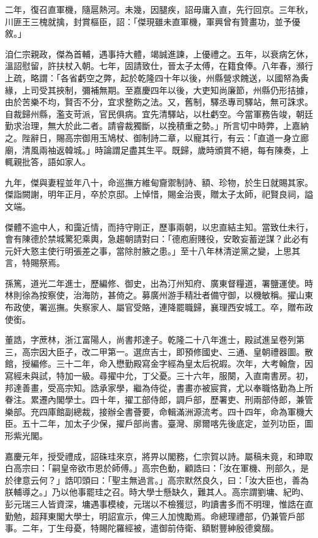 \begin{pinyinscope}
二年，復召直軍機，隨扈熱河。未幾，因腿疾，詔毋庸入直，先行回京。三年秋，川匪王三槐就擒，封賞樞臣，詔：「傑現雖未直軍機，軍興曾有贊畫功，並予優敘。」

洎仁宗親政，傑為首輔，遇事持大體，竭誠進諫，上優禮之。五年，以衰病乞休，溫詔慰留，許扶杖入朝。七年，固請致仕，晉太子太傅，在籍食俸。八年春，瀕行上疏，略謂：「各省虧空之弊，起於乾隆四十年以後，州縣營求餽送，以國帑為夤緣，上司受其挾制，彌補無期。至嘉慶四年以後，大吏知尚廉節，州縣仍形拮據，由於苦樂不均，賢否不分，宜求整飭之法。又，舊制，驛丞專司驛站，無可誅求。自裁歸州縣，濫支苛派，官民俱病。宜先清驛站，以杜虧空。今當軍務告竣，朝廷勤求治理，無大於此二者。請睿裁獨斷，以挽積重之勢。」所言切中時弊，上嘉納之。陛辭日，賜高宗御用玉鳩杖、御制詩二章，以寵其行，有云：「直道一身立廊廟，清風兩袖返韓城。」時論謂足盡其生平。既歸，歲時頒賞不絕，每有陳奏，上輒親批答，語如家人。

九年，傑與妻程並年八十，命巡撫方維甸齎禦制詩、額、珍物，於生日就賜其家。傑詣闕謝，明年正月，卒於京邸。上悼惜，賜金治喪，贈太子太師，祀賢良祠，謚文端。

傑體不逾中人，和靄近情，而持守剛正，歷事兩朝，以忠直結主知。當致仕未行，會有陳德於禁城驚犯乘輿，急趨朝請對曰：「德庖廚賤役，安敢妄蓄逆謀？此必有元奸大憝主使行明張差之事，當除肘腋之患。」至十八年林清逆黨之變，上思其言，特賜祭焉。

孫篤，道光二年進士，歷編修、御史，出為汀州知府、廣東督糧道，署鹽運使。時林則徐為按察使，治海防，甚倚之。募廣州游手精壯者備守御，以機敏稱。擢山東布政使，署巡撫。失察家人、屬官受賂，連降罷職歸，襄理西安城工。卒，贈布政使銜。

董誥，字蔗林，浙江富陽人，尚書邦達子。乾隆二十八年進士，殿試進呈卷列第三，高宗因大臣子，改二甲第一。選庶吉士，即預修國史、三通、皇朝禮器圖。散館，授編修。三十二年，命入懋勤殿寫金字經為皇太后祝嘏。次年，大考翰詹，因寫經未與試，特加一級。尋擢中允，丁父憂。三十六年，服闋，入直南書房。初，邦達善畫，受高宗知。誥承家學，繼為侍從，書畫亦被宸賞，尤以奉職恪勤為上所眷注。累遷內閣學士。四十年，擢工部侍郎，調戶部，歷署吏、刑兩部侍郎，兼管樂部。充四庫館副總裁，接辦全書薈要，命輯滿洲源流考。四十四年，命為軍機大臣。五十二年，加太子少保，擢戶部尚書。臺灣、廓爾喀先後底定，並列功臣，圖形紫光閣。

嘉慶元年，授受禮成，詔硃珪來京，將畀以閣務，仁宗賀以詩。屬稿未竟，和珅取白高宗曰：「嗣皇帝欲市恩於師傅。」高宗色動，顧誥曰：「汝在軍機、刑部久，是於律意云何？」誥叩頭曰：「聖主無過言。」高宗默然良久，曰：「汝大臣也，善為朕輔導之。」乃以他事罷珪之召。時大學士懸缺久，難其人。高宗謂劉墉、紀昀、彭元瑞三人皆資深，墉遇事模棱，元瑞以不檢獲愆，昀讀書多而不明理，惟誥在直勤勉，超拜東閣大學士，明詔宣示，俾三人加愧勵焉。命總理禮部，仍兼管戶部事。二年，丁生母憂，特賜陀羅經被，遣御前侍衛、額駙豐紳殷德奠醊。


\end{pinyinscope}
